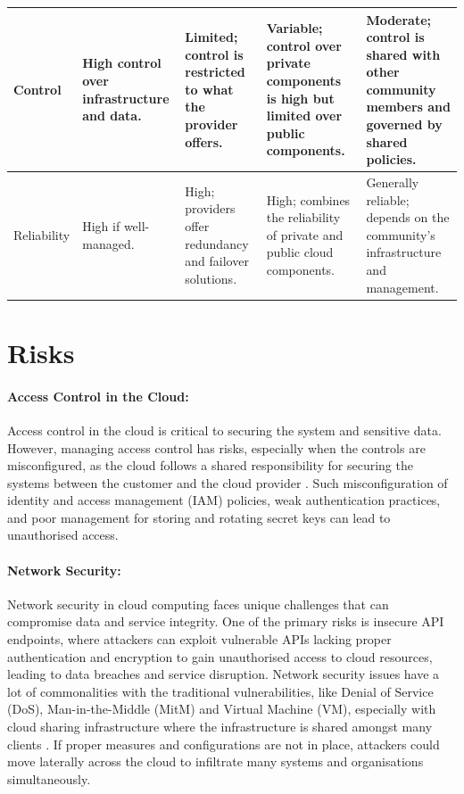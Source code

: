 \begin{longtable}{|p{2cm}| p{3cm} |p{3cm} |p{3cm}|p{3cm}|}
\hline
Control & High control over infrastructure and data. & Limited; control is restricted to what the provider offers. & Variable; control over private components is high but limited over public components. & Moderate; control is shared with other community members and governed by shared policies. \\
\hline
Reliability & High if well-managed. & High; providers offer redundancy and failover solutions. & High; combines the reliability of private and public cloud components. & Generally reliable; depends on the community's infrastructure and management. \\
\hline
\end{longtable}
\endgroup

\section{Risks}
    \paragraph{Access Control in the Cloud:} Access control in the cloud is critical to securing the system and sensitive data. However, managing access control has risks, especially when the controls are misconfigured, as the cloud follows a shared responsibility for securing the systems between the customer and the cloud provider \citep{cloud_shared_resp}. Such misconfiguration of identity and access management (IAM) policies, weak authentication practices, and poor management for storing and rotating secret keys can lead to unauthorised access.
     

    
    \paragraph{Network Security:} Network security in cloud computing faces unique challenges that can compromise data and service integrity. One of the primary risks is insecure API endpoints, where attackers can exploit vulnerable APIs lacking proper authentication and encryption to gain unauthorised access to cloud resources, leading to data breaches and service disruption. Network security issues have a lot of commonalities with the traditional vulnerabilities, like Denial of Service (DoS), Man-in-the-Middle (MitM) and Virtual Machine (VM), especially with cloud sharing infrastructure where the infrastructure is shared amongst many clients \citep{network_cloud}. If proper measures and configurations are not in place, attackers could move laterally across the cloud to infiltrate many systems and organisations simultaneously. 
     
